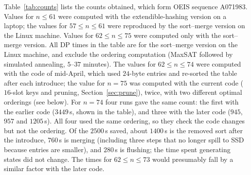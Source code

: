 \documentclass[12pt]{article}
\theoremstyle{definition}
\begin{document}
Table~\ref{tab:counts} lists the counts obtained, which form OEIS
sequence A071983.
Values for $n\le 61$ were computed with the extendible-hashing version on a
laptop; the values for $57\le n\le 61$ were reproduced by the sort--merge
version on the Linux machine.
Values for $62\le n\le 75$ were computed only with the sort--merge version.
All DP times in the table are for the sort--merge version on the Linux
machine, and exclude the ordering computation
(MaxSAT followed by simulated annealing, $5$--$37$ minutes).
The values for $62\le n\le 74$ were computed with the code of mid-April,
which used $24$-byte entries and re-sorted the table after each introduce;
the value for $n=75$ was computed with the current code ($16$-slot keys and
pruning, Section~\ref{sec:prune}), twice, with two different optimal orderings
(see below).
For $n=74$ four runs gave the same count: the first with the earlier code
($3449$\,s, shown in the table), and three with the later code ($945$, $957$
and $1205$\,s).
All four used the same ordering, so they check the code changes but not the
ordering.
Of the $2500$\,s saved, about $1400$\,s is the removed sort after the
introduce, $760$\,s is merging (including three steps that no longer spill to
SSD because entries are smaller), and $280$\,s is flushing; the time spent
generating states did not change.
The times for $62\le n\le 73$ would presumably fall by a similar factor with
the later code.
\end{document}

